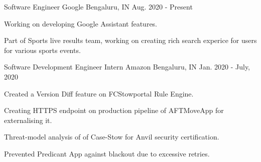 


\begin{cventries}


\cventry
{Software Engineer} %
{Google} %
{Bengaluru, IN} %
{Aug. 2020 - Present} %
{ %
\begin{cvitems}
\item {Working on developing Google Assistant features.}
\item {Part of Sports live results team, working on creating rich search experice for users for various sports events.}
\end{cvitems}
}


\cventry
{Software Development Engineer Intern} %
{Amazon} %
{Bengaluru, IN} %
{Jan. 2020 - July, 2020} %
{ %
\begin{cvitems}
\item {Created a Version Diff feature on FCStowportal Rule Engine.}
\item {Creating HTTPS endpoint on production pipeline of AFTMoveApp for externalising it.}
\item {Threat-model analysis of of Case-Stow for Anvil security certification.}
\item {Prevented Predicant App against blackout due to excessive retries.}
\end{cvitems}
}


\end{cventries}